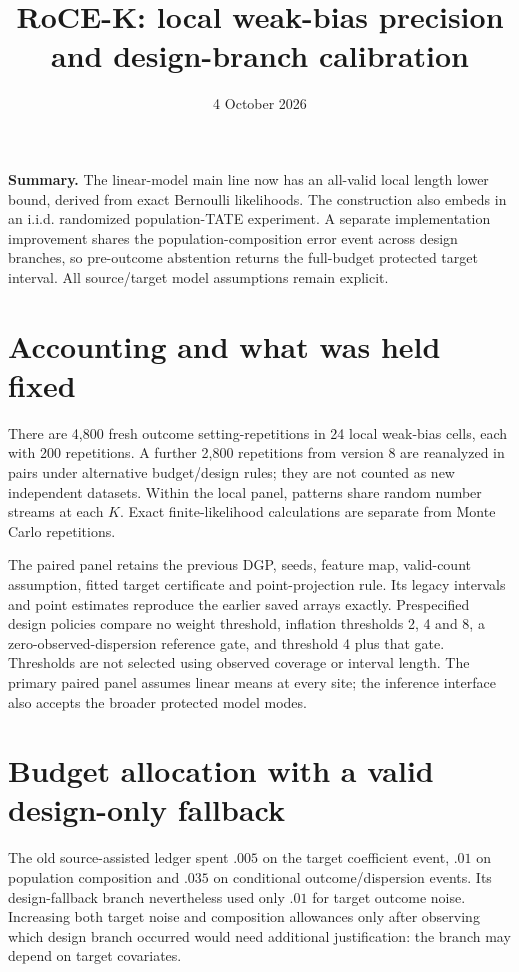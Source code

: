 \documentclass[11pt]{article}
\title{RoCE-K: local weak-bias precision and design-branch calibration}
\author{}\date{4 October 2026}
\begin{document}
\maketitle

\textbf{Summary.} The linear-model main line now has an all-valid local
length lower bound, derived from exact Bernoulli likelihoods. The construction
also embeds in an i.i.d. randomized population-TATE experiment. A separate
implementation improvement shares the population-composition error event
across design branches, so pre-outcome abstention returns the full-budget
protected target interval. All source/target model assumptions remain explicit.

\section{Accounting and what was held fixed}

There are 4,800 fresh outcome setting-repetitions in 24 local weak-bias cells,
each with 200 repetitions. A further 2,800 repetitions from version 8 are
reanalyzed in pairs under alternative budget/design rules; they are not counted
as new independent datasets. Within the local panel, patterns share random
number streams at each $K$. Exact finite-likelihood calculations are separate
from Monte Carlo repetitions.

The paired panel retains the previous DGP, seeds, feature map, valid-count
assumption, fitted target certificate and point-projection rule. Its legacy
intervals and point estimates reproduce the earlier saved arrays exactly.
Prespecified design policies compare no weight threshold, inflation thresholds
2, 4 and 8, a zero-observed-dispersion reference gate, and threshold 4 plus
that gate. Thresholds are not selected using observed coverage or interval
length. The primary paired panel assumes linear means at every site; the
inference interface also accepts the broader protected model modes.

\section{Budget allocation with a valid design-only fallback}

The old source-assisted ledger spent $.005$ on the target coefficient event,
$.01$ on population composition and $.035$ on conditional outcome/dispersion
events. Its design-fallback branch nevertheless used only $.01$ for target
outcome noise. Increasing both target noise and composition allowances only
after observing which design branch occurred would need additional justification:
the branch may depend on target covariates.
\end{document}
